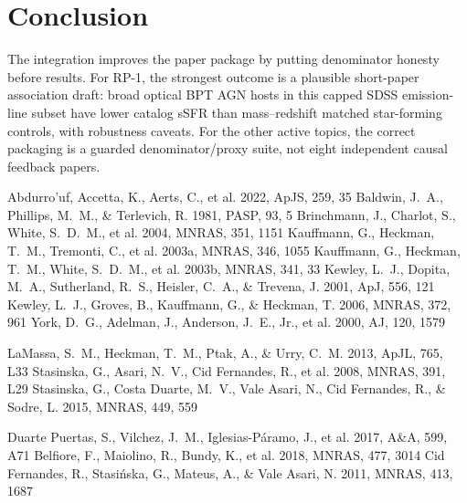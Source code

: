 \documentclass[twocolumn]{aastex631}
\begin{document}
\section{Conclusion}\label{sec:conclusion}
The integration improves the paper package by putting denominator honesty before results. For RP-1, the strongest outcome is a plausible short-paper association draft: broad optical BPT AGN hosts in this capped SDSS emission-line subset have lower catalog sSFR than mass--redshift matched star-forming controls, with robustness caveats. For the other active topics, the correct packaging is a guarded denominator/proxy suite, not eight independent causal feedback papers.


\begin{thebibliography}{}
 Abdurro'uf, Accetta, K., Aerts, C., et al. 2022, ApJS, 259, 35
 Baldwin, J.~A., Phillips, M.~M., \& Terlevich, R. 1981, PASP, 93, 5
 Brinchmann, J., Charlot, S., White, S.~D.~M., et al. 2004, MNRAS, 351, 1151
 Kauffmann, G., Heckman, T.~M., Tremonti, C., et al. 2003a, MNRAS, 346, 1055
 Kauffmann, G., Heckman, T.~M., White, S.~D.~M., et al. 2003b, MNRAS, 341, 33
 Kewley, L.~J., Dopita, M.~A., Sutherland, R.~S., Heisler, C.~A., \& Trevena, J. 2001, ApJ, 556, 121
 Kewley, L.~J., Groves, B., Kauffmann, G., \& Heckman, T. 2006, MNRAS, 372, 961
 York, D.~G., Adelman, J., Anderson, J.~E., Jr., et al. 2000, AJ, 120, 1579

 LaMassa, S.~M., Heckman, T.~M., Ptak, A., \& Urry, C.~M. 2013, ApJL, 765, L33
 Stasinska, G., Asari, N.~V., Cid Fernandes, R., et al. 2008, MNRAS, 391, L29
 Stasinska, G., Costa Duarte, M.~V., Vale Asari, N., Cid Fernandes, R., \& Sodre, L. 2015, MNRAS, 449, 559

 Duarte Puertas, S., Vilchez, J.~M., Iglesias-Páramo, J., et al. 2017, A\&A, 599, A71
 Belfiore, F., Maiolino, R., Bundy, K., et al. 2018, MNRAS, 477, 3014
 Cid Fernandes, R., Stasińska, G., Mateus, A., \& Vale Asari, N. 2011, MNRAS, 413, 1687
\end{thebibliography}
\end{document}

